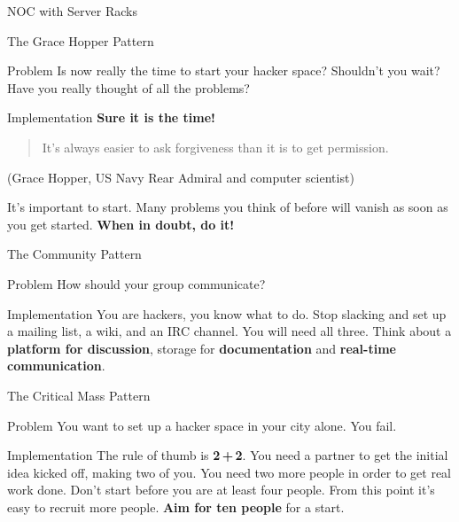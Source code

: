 \documentclass[mathserif]{beamer}
\begin{document}
\begin{frame}[plain]{NOC with Server Racks}
	\begin{center}
	\end{center}
\end{frame}

\begin{frame}{The Grace Hopper Pattern}
	\begin{alertblock}{Problem}
		Is now really the time to start your hacker space?  Shouldn't you wait?
		Have you really thought of all the problems?
	\end{alertblock}
	\pause
	\begin{exampleblock}{Implementation}
		\textbf{Sure it is the time!}
		\begin{quote}
			It's always easier to ask forgiveness than it is to get permission.
		\end{quote}
		(Grace Hopper, US Navy Rear Admiral and computer scientist)

		It's important to start.  Many problems you think of before will vanish as
		soon as you get started.  \textbf{When in doubt, do it!}
	\end{exampleblock}
\end{frame}

\begin{frame}{The Community Pattern}
	\begin{alertblock}{Problem}
		How should your group communicate?
	\end{alertblock}
	\pause
	\begin{exampleblock}{Implementation}
		You are hackers, you know what to do.  Stop slacking and set up a mailing
		list, a wiki, and an IRC channel.  You will need all three.  Think about a
		\textbf{platform for discussion}, storage for \textbf{documentation}
		and \textbf{real-time communication}.
	\end{exampleblock}
\end{frame}

\begin{frame}{The Critical Mass Pattern}
	\begin{alertblock}{Problem}
		You want to set up a hacker space in your city alone.  You fail.
	\end{alertblock}
	\pause
	\begin{exampleblock}{Implementation}
		The rule of thumb is \textbf{2\,+\,2}.  You need a partner to get the initial
		idea kicked off, making two of you.  You need two more people in order to
		get real work done.  Don't start before you are at least four people.  From
		this point it's easy to recruit more people.  \textbf{Aim for ten people} for
		a start.
	\end{exampleblock}
\end{frame}
\end{document}
